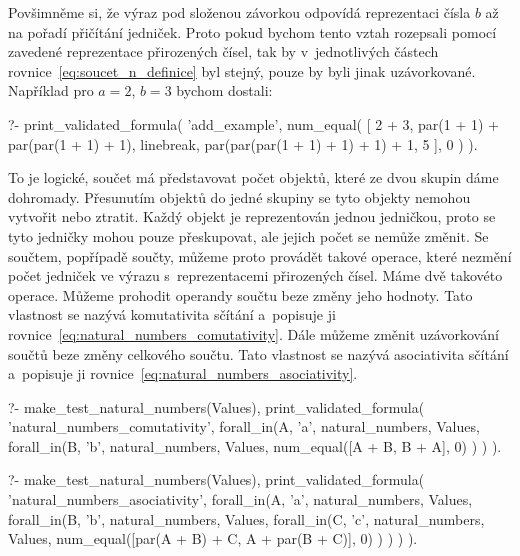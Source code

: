 Povšimněme si, že výraz pod složenou závorkou odpovídá reprezentaci čísla \(b\) až na pořadí přičítání jedniček. Proto pokud bychom tento vztah rozepsali pomocí zavedené reprezentace přirozených čísel, tak by  v~jednotlivých částech rovnice~\eqref{eq:soucet_n_definice} byl stejný, pouze by byli jinak uzávorkované. Například pro \(a=2\), \(b=3\) bychom dostali:

\begin{prolog}
?-	print_validated_formula(
		'add_example',
		num_equal(
			[
				2 + 3,
				par(1 + 1) + par(par(1 + 1) + 1),
				linebreak,
				par(par(par(1 + 1) + 1) + 1) + 1,
				5
			],
			0
		)
	).
\end{prolog}

To je logické, součet má představovat počet objektů, které ze dvou skupin dáme dohromady. Přesunutím objektů do jedné skupiny se tyto objekty nemohou vytvořit nebo ztratit. Každý objekt je reprezentován jednou jedničkou, proto se tyto jedničky mohou pouze přeskupovat, ale jejich počet se nemůže změnit. Se součtem, popřípadě součty, můžeme proto provádět takové operace, které nezmění počet jedniček ve výrazu s~reprezentacemi přirozených čísel. Máme dvě takovéto operace. Můžeme prohodit operandy součtu beze změny jeho hodnoty. Tato vlastnost se nazývá komutativita sčítání a~popisuje ji rovnice~\eqref{eq:natural_numbers_comutativity}. Dále můžeme změnit uzávorkování součtů beze změny celkového součtu. Tato vlastnost se nazývá asociativita sčítání a~popisuje ji rovnice~\eqref{eq:natural_numbers_asociativity}.

\begin{fact}
\begin{prolog}
?-	make_test_natural_numbers(Values),
	print_validated_formula(
		'natural_numbers_comutativity',
		forall_in(A, 'a', natural_numbers, Values,
			forall_in(B, 'b', natural_numbers, Values,
				num_equal([A + B, B + A], 0)
			)
		)
	).
\end{prolog}
\begin{prolog}
?-	make_test_natural_numbers(Values),
	print_validated_formula(
		'natural_numbers_asociativity',
		forall_in(A, 'a', natural_numbers, Values,
			forall_in(B, 'b', natural_numbers, Values,
				forall_in(C, 'c', natural_numbers, Values,
					num_equal([par(A + B) + C, A + par(B + C)], 0)
				)
			)
		)
	).
\end{prolog}
\end{fact}

